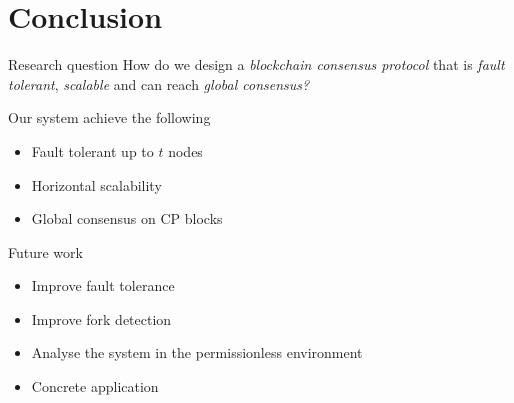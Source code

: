 \documentclass{beamer}
\begin{document}
\section{Conclusion}
\begin{frame}{\secname}
  \begin{block}{Research question}
    How do we design a \emph{blockchain consensus protocol} that is \emph{fault tolerant},
    \emph{scalable} and can reach \emph{global consensus?}
  \end{block}
Our system achieve the following
\begin{itemize}
  \item Fault tolerant up to $t$ nodes
  \item Horizontal scalability
  \item Global consensus on CP blocks
\end{itemize}
\end{frame}

\begin{frame}{Future work}
\begin{itemize}
\item Improve fault tolerance
\item Improve fork detection
\item Analyse the system in the permissionless environment
\item Concrete application
\end{itemize}
\end{frame}
\end{document}
